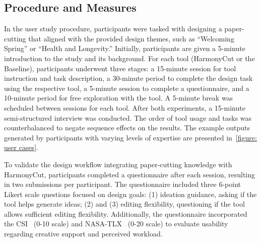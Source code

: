 \subsection{Procedure and Measures}
In the user study procedure, participants were tasked with designing a paper-cutting that aligned with the provided design themes, such as ``Welcoming Spring'' or ``Health and Longevity.'' Initially, participants are given a 5-minute introduction to the study and its background. For each tool (HarmonyCut or the Baseline), participants underwent three stages: a 15-minute session for tool instruction and task description, a 30-minute period to complete the design task using the respective tool, a 5-minute session to complete a questionnaire, and a 10-minute period for free exploration with the tool. A 5-minute break was scheduled between sessions for each tool. After both experiments, a 15-minute semi-structured interview was conducted. The order of tool usage and tasks was counterbalanced to negate sequence effects on the results. The example outputs generated by participants with varying levels of expertise are presented in~\autoref{figure: user cases}.


To validate the design workflow integrating paper-cutting knowledge with HarmonyCut, participants completed a questionnaire after each session, resulting in two submissions per participant. The questionnaire included three 6-point Likert scale questions focused on design goals: (1) ideation guidance, asking if the tool helps generate ideas; (2)  and (3) editing flexibility, questioning if the tool allows sufficient editing flexibility. Additionally, the questionnaire incorporated the CSI~\cite{Cherry:2014:csi} (0-10 scale) and NASA-TLX~\cite{Hart:2006:nasa} (0-20 scale) to evaluate usability regarding creative support and perceived workload. 

